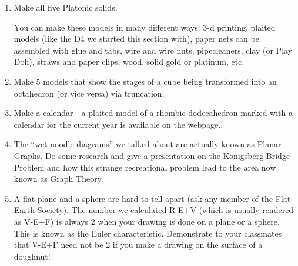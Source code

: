 \begin{enumerate}
    \item Make all five Platonic solids.
    
    You can make these models in many different ways:  3-d printing, plaited models (like the D4 we started this section with), paper nets can be assembled with glue and tabs, wire and wire nuts, pipecleaners, clay (or Play Doh), straws and paper clips, wood, solid gold or platinum, etc.
    
    \item Make 5 models that show the stages of a cube being transformed into an octahedron (or vice versa) via truncation.
    
    \item Make a calendar - a plaited model of a rhombic dodecahedron marked with a calendar for the current year is available on the webpage..
       
    \item The ``wet noodle diagrams'' we talked about are actually known as Planar Graphs.  Do some research and give a presentation on the K\"{o}nigsberg Bridge Problem and how this strange recreational problem lead to the area now known as Graph Theory.
        
    \item A flat plane and a sphere are hard to tell apart (ask any member of the Flat Earth Society).  The number we calculated R-E+V (which is usually rendered as V-E+F) is always 2 when your drawing is done on a plane or a sphere.  This is known as the Euler characteristic.  Demonstrate to your classmates that V-E+F need not be 2 if you make a drawing on the surface of a doughnut!
    
\end{enumerate}
